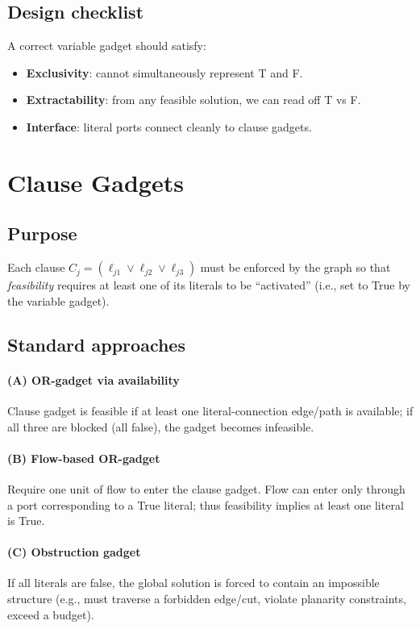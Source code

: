 \documentclass[11pt]{article}
\begin{document}
\subsection{Design checklist}
A correct variable gadget should satisfy:
\begin{itemize}[itemsep=2pt]
  \item \textbf{Exclusivity}: cannot simultaneously represent T and F.
  \item \textbf{Extractability}: from any feasible solution, we can read off T vs F.
  \item \textbf{Interface}: literal ports connect cleanly to clause gadgets.
\end{itemize}

\section{Clause Gadgets}
\subsection{Purpose}
Each clause $C_j=(\ell_{j1}\lor \ell_{j2}\lor \ell_{j3})$ must be enforced by the graph so that \emph{feasibility} requires at least one of its literals to be ``activated'' (i.e., set to True by the variable gadget).

\subsection{Standard approaches}
\paragraph{(A) OR-gadget via availability}
Clause gadget is feasible if at least one literal-connection edge/path is available; if all three are blocked (all false), the gadget becomes infeasible.

\paragraph{(B) Flow-based OR-gadget}
Require one unit of flow to enter the clause gadget. Flow can enter only through a port corresponding to a True literal; thus feasibility implies at least one literal is True.

\paragraph{(C) Obstruction gadget}
If all literals are false, the global solution is forced to contain an impossible structure (e.g., must traverse a forbidden edge/cut, violate planarity constraints, exceed a budget).
\end{document}
